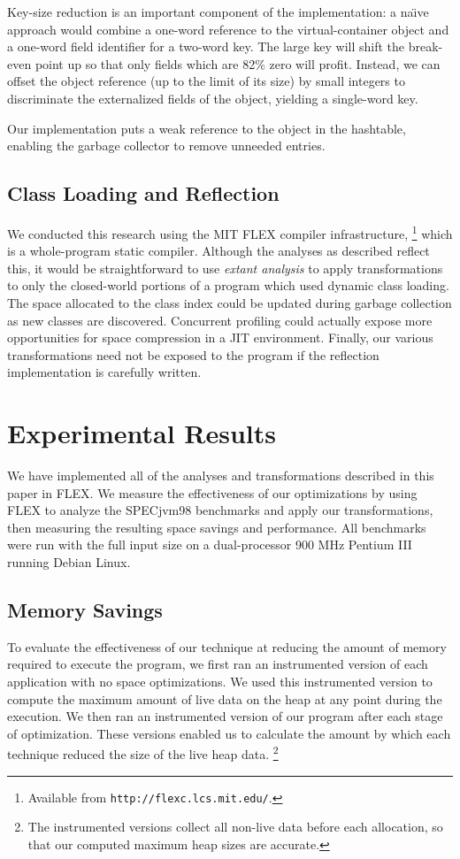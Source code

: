 \documentclass{sig-alt-full}
\begin{document}
Key-size reduction is an important component of the implementation:
a na{\"\i}ve approach
would combine a one-word reference to the virtual-container object and a
one-word field identifier for a two-word key.  The large key will
shift the break-even point up so that only fields which are 82\% zero
will profit.  Instead, we can offset the
object reference (up to the limit of its size) by small integers
to discriminate the externalized fields of the object, yielding
a single-word key.

Our implementation puts a weak reference to the object in the
hashtable, enabling the garbage collector to remove unneeded entries.
%
\subsection{Class Loading and Reflection}
We conducted this research using the MIT FLEX compiler infrastructure,%
\footnote{Available from {\tt http://flexc.lcs.mit.edu/}.} which is a
whole-program static compiler.  Although the analyses as described reflect
this, it would be straightforward to use \emph{extant analysis}
\cite{sreedhar00} to apply transformations to only the closed-world
portions of a program which used dynamic class loading.  The space
allocated to the class index could be updated during garbage collection
as new classes are discovered.  Concurrent profiling could actually
expose more opportunities for space compression in a JIT environment.
Finally, our various transformations need not be exposed to the program if the
reflection implementation is carefully written.
%
\section{Experimental Results}
\label{sec:results}
%
We have implemented all of the analyses and transformations described
in this paper in FLEX.
We measure the effectiveness
of our optimizations by using FLEX to analyze the SPECjvm98 benchmarks
and apply our transformations,
then measuring the resulting space savings and
performance.   All benchmarks were run with the full input size
on a dual-processor 900 MHz
Pentium III running Debian Linux.
%
\subsection{Memory Savings}
%
To evaluate the effectiveness of our technique at reducing the
amount of memory required to execute the program, 
we first ran an instrumented version of each
application with no space optimizations. We used this
instrumented version to compute the maximum amount of live data on the
heap at any point during the execution.  
We then ran an instrumented version of our program after each stage of
optimization.
These versions enabled us to calculate the amount by which each 
technique reduced the size of the live heap data.%
\footnote{The instrumented versions collect all non-live data before
each allocation, so that our computed maximum heap sizes are accurate.}
\end{document}
